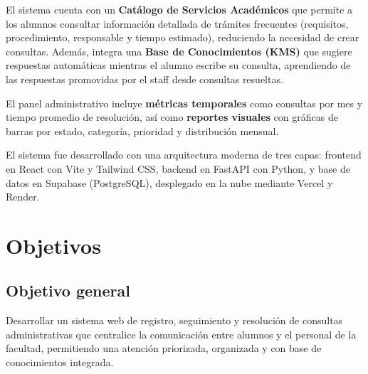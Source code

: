 \documentclass[12pt,a4paper]{article}
\begin{document}
	El sistema cuenta con un \textbf{Catálogo de Servicios Académicos} que permite a los alumnos consultar información detallada de trámites frecuentes (requisitos, procedimiento, responsable y tiempo estimado), reduciendo la necesidad de crear consultas. Además, integra una \textbf{Base de Conocimientos (KMS)} que sugiere respuestas automáticas mientras el alumno escribe su consulta, aprendiendo de las respuestas promovidas por el staff desde consultas resueltas.

	El panel administrativo incluye \textbf{métricas temporales} como consultas por mes y tiempo promedio de resolución, así como \textbf{reportes visuales} con gráficas de barras por estado, categoría, prioridad y distribución mensual.

	El sistema fue desarrollado con una arquitectura moderna de tres capas: frontend en React con Vite y Tailwind CSS, backend en FastAPI con Python, y base de datos en Supabase (PostgreSQL), desplegado en la nube mediante Vercel y Render.

	\section{Objetivos}
	\subsection{Objetivo general}
	\hspace{1cm}Desarrollar un sistema web de registro, seguimiento y resolución de consultas administrativas que centralice la comunicación entre alumnos y el personal de la facultad, permitiendo una atención priorizada, organizada y con base de conocimientos integrada.
\end{document}
